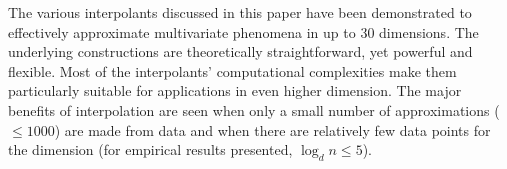 \documentclass[smallextended,final]{svjour3}       %
\begin{document}
The various interpolants discussed in this paper have been
demonstrated to effectively approximate multivariate phenomena in up
to $30$ dimensions. The underlying constructions are theoretically
straightforward, yet powerful and flexible. Most of the interpolants'
computational complexities make them particularly suitable for
applications in even higher dimension. The major benefits of
interpolation are seen when only a small number of approximations
($\leq 1000$) are made from data and when there are relatively few
data points for the dimension (for empirical results presented, $\log_d n \leq 5$).





\newpage
\end{document}
